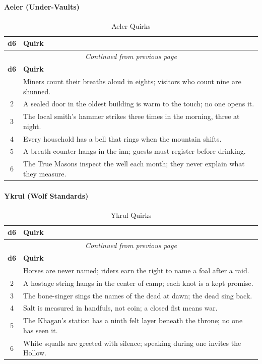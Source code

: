 \paragraph{Aeler (Under-Vaults)}
\begin{center}
\begin{longtable}{cl}
\caption{Aeler Quirks}\\
\toprule
\textbf{d6} & \textbf{Quirk} \\
\midrule
\endfirsthead
\multicolumn{2}{c}{\emph{Continued from previous page}} \\
\toprule
\textbf{d6} & \textbf{Quirk} \\
\midrule
\endhead
\bottomrule
\endfoot
1 & Miners count their breaths aloud in eights; visitors who count nine are shunned. \\
2 & A sealed door in the oldest building is warm to the touch; no one opens it. \\
3 & The local smith's hammer strikes three times in the morning, three at night. \\
4 & Every household has a bell that rings when the mountain shifts. \\
5 & A breath-counter hangs in the inn; guests must register before drinking. \\
6 & The True Masons inspect the well each month; they never explain what they measure. \\
\end{longtable}
\end{center}

\paragraph{Ykrul (Wolf Standards)}
\begin{center}
\begin{longtable}{cl}
\caption{Ykrul Quirks}\\
\toprule
\textbf{d6} & \textbf{Quirk} \\
\midrule
\endfirsthead
\multicolumn{2}{c}{\emph{Continued from previous page}} \\
\toprule
\textbf{d6} & \textbf{Quirk} \\
\midrule
\endhead
\bottomrule
\endfoot
1 & Horses are never named; riders earn the right to name a foal after a raid. \\
2 & A hostage string hangs in the center of camp; each knot is a kept promise. \\
3 & The bone-singer sings the names of the dead at dawn; the dead sing back. \\
4 & Salt is measured in handfuls, not coin; a closed fist means war. \\
5 & The Khagan's station has a ninth felt layer beneath the throne; no one has seen it. \\
6 & White squalls are greeted with silence; speaking during one invites the Hollow. \\
\end{longtable}
\end{center}

